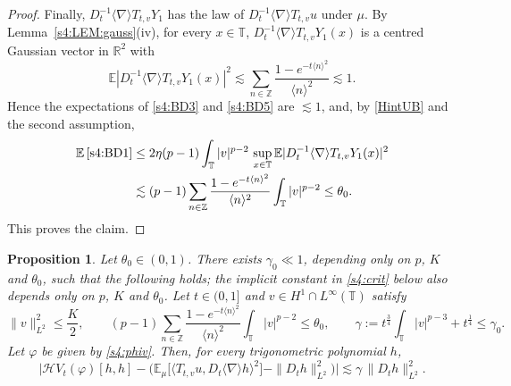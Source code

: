 \documentclass[letterpaper, 11pt,  reqno]{amsart}
\newtheorem{proposition}[theorem]{Proposition}
\theoremstyle{definition}
\newcommand{\1}{\mathbbm 1}
\newcommand{\Z}{\mathbb{Z}}
\newcommand{\R}{\mathbb{R}}
\newcommand{\T}{\mathbb{T}}
\renewcommand{\H}{\mathcal H}
\newcommand{\0}{\mathbf 0}
\newcommand{\E}{\mathbb{E}}
\newcommand{\nb}{\nabla}
\newcommand{\les}{\lesssim}
\newcommand{\jb}[1]
{\langle #1 \rangle}
\newcommand{\ph}{\varphi}
\renewcommand{\H}{\mathcal{H}}
\numberwithin{equation}{section}
\numberwithin{theorem}{section}
\begin{document}
\begin{proof}
Finally, $D_t^{-1}\jb\nb T_{t,v}Y_1$ has the law of $D_t^{-1}\jb\nb T_{t,v}u$ under $\mu$. By
Lemma~\ref{s4:LEM:gauss}(iv), for every $x\in\T$, $D_t^{-1}\jb\nb T_{t,v}Y_1(x)$ is a centred Gaussian vector
in $\R^2$ with
\[
\E|D_t^{-1}\jb\nb T_{t,v}Y_1(x)|^2\les\sum_{n\in\Z}\frac{1-e^{-t\jb n^2}}{\jb n^2}\les1.
\]
Hence the expectations of \eqref{s4:BD3} and \eqref{s4:BD5} are $\les1$, and, by \eqref{HintUB}
and the second assumption,
\[
\begin{aligned}
\E\,\eqref{s4:BD1}&\le2\eta(p-1)\int_\T|v|^{p-2}\,\sup_{x\in\T}\E|D_t^{-1}\jb\nb T_{t,v}Y_1(x)|^2\\
&\les(p-1)\sum_{n\in\Z}\frac{1-e^{-t\jb n^2}}{\jb n^2}\int_\T|v|^{p-2}\le\theta_0 .
\end{aligned}
\]
This proves the claim.
\end{proof}

\begin{proposition}
\label{s4:PROP:crit}
Let $\theta_0\in(0,1)$. There exists $\gamma_0\ll1$,
depending only on $p$, $K$ and $\theta_0$, such that the following holds; the implicit constant in \eqref{s4:crit} below also depends only on $p$, $K$ and $\theta_0$. Let $t\in(0,1]$ and
$v\in H^1\cap L^\infty(\T)$ satisfy
\[
\|v\|_{L^2}^2\le\frac K2,\qquad (p-1)\sum_{n\in\Z}\frac{1-e^{-t\jb n^2}}{\jb n^2}\int_\T|v|^{p-2}\le\theta_0,
\qquad
\gamma:=t^{\frac34}\int_\T|v|^{p-3}+t^{\frac14}\le\gamma_0 .
\]
Let $\ph$ be given by \eqref{s4:phiv}. Then, for every trigonometric polynomial $h$,
\begin{equation}\label{s4:crit}
\Big|\H V_t(\ph)[h,h]-\Big(\E_\mu\big[\jb{T_{t,v}u,D_t\jb\nb h}^2\big]-\|D_th\|_{L^2}^2\Big)\Big|
\les \gamma\,\|D_th\|_{L^2}^2 .
\end{equation}
\end{proposition}
\end{document}
